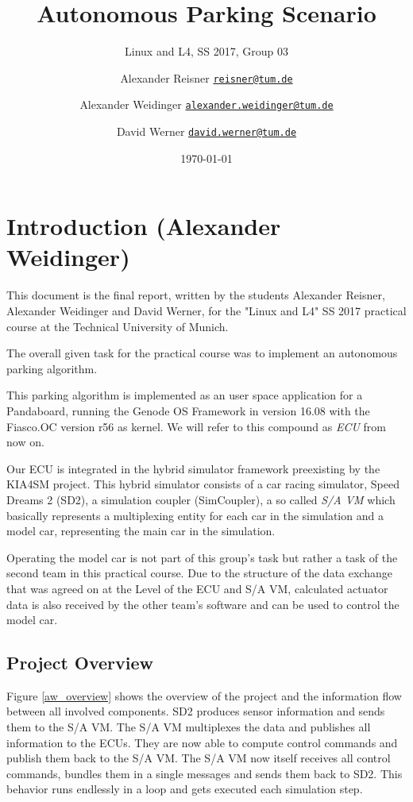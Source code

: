 \documentclass[paper=a4, fontsize=11pt]{scrreprt}
\title{Autonomous Parking Scenario}
\subtitle{Linux and L4, SS 2017, Group 03}
\author{Alexander Reisner \href{mailto:reisner@tum.de}{\texttt{reisner@tum.de}} \and
Alexander Weidinger \href{mailto:alexander.weidinger@tum.de}{\texttt{alexander.weidinger@tum.de}} \and
David Werner \href{mailto:david.werner@tum.de}{\texttt{david.werner@tum.de}}}
\date{\today}
\begin{document}
\maketitle
\newpage

\tableofcontents
\newpage

\chapter{Introduction (Alexander Weidinger)}
This document is the final report, written by the students Alexander Reisner,
Alexander Weidinger and David Werner, for the "Linux and L4" SS 2017 practical course at the Technical University of Munich.

The overall given task for the practical course was to implement an autonomous parking algorithm.

This parking algorithm is implemented as an user space application for a Pandaboard,
running the Genode OS Framework in version 16.08 with the Fiasco.OC version r56 as kernel.
We will refer to this compound as \textit{ECU} from now on.

Our ECU is integrated in the hybrid simulator framework preexisting by the KIA4SM project.
This hybrid simulator consists of a car racing simulator, Speed Dreams 2 (SD2),
a simulation coupler (SimCoupler), a so called \textit{S/A VM} which basically represents a multiplexing entity for each car in the simulation
and a model car, representing the main car in the simulation.

Operating the model car is not part of this group's task but rather a task of the second team in this practical course.
Due to the structure of the data exchange that was agreed on at the Level of the ECU and S/A VM,
calculated actuator data is also received by the other team's software and can be used to control the model car.

\section{Project Overview}
Figure \ref{aw_overview} shows the overview of the project
and the information flow between all involved components.
SD2 produces sensor information and sends them to the S/A VM.
The S/A VM multiplexes the data and publishes all information to the ECUs.
They are now able to compute control commands and publish them back to the S/A VM.
The S/A VM now itself receives all control commands, bundles them in a single messages
and sends them back to SD2.
This behavior runs endlessly in a loop and gets executed each simulation step.
\end{document}
